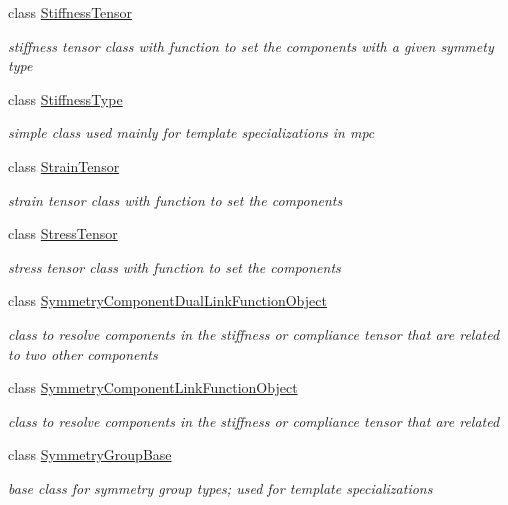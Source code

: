 \begin{DoxyCompactItemize}
class \mbox{\hyperlink{structmpc_1_1core_1_1_stiffness_tensor}{Stiffness\+Tensor}}
\begin{DoxyCompactList}\small\item\em stiffness tensor class with function to set the components with a given symmety type \end{DoxyCompactList}\item 
class \mbox{\hyperlink{structmpc_1_1core_1_1_stiffness_type}{Stiffness\+Type}}
\begin{DoxyCompactList}\small\item\em simple class used mainly for template specializations in mpc \end{DoxyCompactList}\item 
class \mbox{\hyperlink{structmpc_1_1core_1_1_strain_tensor}{Strain\+Tensor}}
\begin{DoxyCompactList}\small\item\em strain tensor class with function to set the components \end{DoxyCompactList}\item 
class \mbox{\hyperlink{structmpc_1_1core_1_1_stress_tensor}{Stress\+Tensor}}
\begin{DoxyCompactList}\small\item\em stress tensor class with function to set the components \end{DoxyCompactList}\item 
class \mbox{\hyperlink{structmpc_1_1core_1_1_symmetry_component_dual_link_function_object}{Symmetry\+Component\+Dual\+Link\+Function\+Object}}
\begin{DoxyCompactList}\small\item\em class to resolve components in the stiffness or compliance tensor that are related to two other components \end{DoxyCompactList}\item 
class \mbox{\hyperlink{structmpc_1_1core_1_1_symmetry_component_link_function_object}{Symmetry\+Component\+Link\+Function\+Object}}
\begin{DoxyCompactList}\small\item\em class to resolve components in the stiffness or compliance tensor that are related \end{DoxyCompactList}\item 
class \mbox{\hyperlink{structmpc_1_1core_1_1_symmetry_group_base}{Symmetry\+Group\+Base}}
\begin{DoxyCompactList}\small\item\em base class for symmetry group types; used for template specializations \end{DoxyCompactList}\item 

\end{DoxyCompactItemize}
